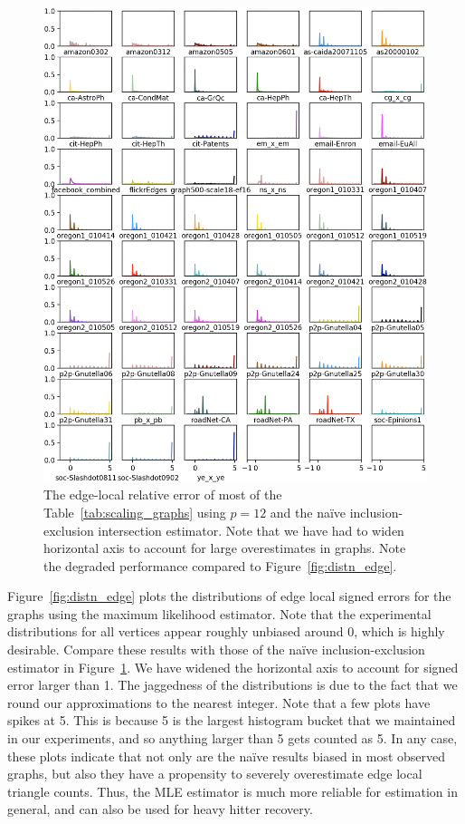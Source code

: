 \documentclass[10]{article}
\begin{document}
\begin{figure}
	\centerline{\includegraphics[width=1.0\columnwidth]{distn_naive_edge_total}}
	\caption{The edge-local relative error of most of the  Table~\ref{tab:scaling_graphs} using $p=12$ and the na\"ive inclusion-exclusion intersection estimator. 
	Note that we have had to widen horizontal axis to account for large overestimates in graphs. 
	Note the degraded performance compared to Figure~\ref{fig:distn_edge}.
	\label{fig:distn_naive_edge}}
\end{figure}


Figure~\ref{fig:distn_edge} plots the distributions of edge local signed errors for the graphs using the maximum likelihood estimator. 
Note that the experimental distributions for all vertices appear roughly unbiased around 0, which is highly desirable.
Compare these results with those of the na\"ive inclusion-exclusion estimator in Figure~\ref{fig:distn_naive_edge}.
We have widened the horizontal axis to account for signed error larger than 1.
The jaggedness of the distributions is due to the fact that we round our approximations to the nearest integer.
Note that a few plots have spikes at 5. 
This is because 5 is the largest histogram bucket that we maintained in our experiments, and so anything larger than 5 gets counted as 5. 
In any case, these plots indicate that not only are the na\"ive results biased in most observed graphs, but also they have a propensity to severely overestimate edge local triangle counts.
Thus, the MLE estimator is much more reliable for estimation in general, and can also be used for heavy hitter recovery.
\end{document}
